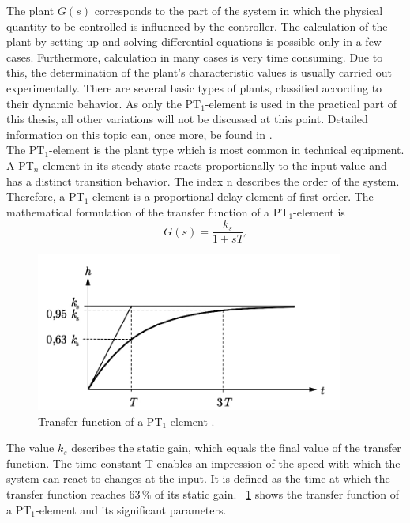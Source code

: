 The plant $G(s)$ corresponds to the part of the system in which the physical quantity to be controlled is influenced by the controller. The calculation of the plant by setting up and solving differential equations is possible only in a few cases. Furthermore, calculation in many cases is very time consuming. Due to this, the determination of the plant's characteristic values is usually carried out experimentally. There are several basic types of plants, classified according to their dynamic behavior. As only the PT$_{1}$-element is used in the practical part of this thesis, all other variations will not be discussed at this point. Detailed information on this topic can, once more, be found in \cite{Reg_10}.
\\The PT$_{1}$-element is the plant type which is most common in technical equipment. A PT$_{n}$-element in its steady state reacts proportionally to the input value and has a distinct transition behavior. The index n describes the order of the system. Therefore, a PT$_{1}$-element is a proportional delay element of first order. The mathematical formulation of the transfer function of a PT$_{1}$-element is
\begin{equation}
    G(s) = \frac{k_{s}}{1+sT}.
 \label{eq:tf_pt1}
\end{equation}

\begin{figure}[h]
   \centering
   \includegraphics[width=0.9\textwidth]{images/tf_pt1.jpg}
   \caption[Transfer function of a PT$_{1}$-element]{Transfer function of a PT$_{1}$-element \cite{Reg_10}.}
   \label{fig:tf_pt1}
 \end{figure}
The value $k_{s}$ describes the static gain, which equals the final value of the transfer function. The time constant T enables an impression of the speed with which the system can react to changes at the input. It is defined as the time at which the transfer function reaches $63\, \%$ of its static gain. \cite{Reg_10}
\figurename~\ref{fig:tf_pt1} shows the transfer function of a PT$_{1}$-element and its significant parameters.


